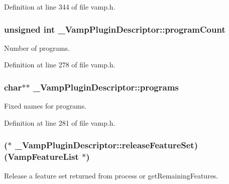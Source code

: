 Definition at line 344 of file vamp.\+h.

\subsubsection[{\texorpdfstring{program\+Count}{programCount}}]{\setlength{\rightskip}{0pt plus 5cm}unsigned {\bf int} \+\_\+\+Vamp\+Plugin\+Descriptor\+::program\+Count}\hypertarget{struct___vamp_plugin_descriptor_a1962666aa173e7a9a2c30dc82e4b2e00}{}\label{struct___vamp_plugin_descriptor_a1962666aa173e7a9a2c30dc82e4b2e00}
Number of programs. 

Definition at line 278 of file vamp.\+h.

\subsubsection[{\texorpdfstring{programs}{programs}}]{ char$\ast$$\ast$ \+\_\+\+Vamp\+Plugin\+Descriptor\+::programs}\hypertarget{struct___vamp_plugin_descriptor_ad488470c582d8472d86455889d71c5ec}{}\label{struct___vamp_plugin_descriptor_ad488470c582d8472d86455889d71c5ec}
Fixed names for programs. 

Definition at line 281 of file vamp.\+h.

\subsubsection[{\texorpdfstring{release\+Feature\+Set}{releaseFeatureSet}}]{($\ast$ \+\_\+\+Vamp\+Plugin\+Descriptor\+::release\+Feature\+Set) ({\bf Vamp\+Feature\+List} $\ast$)}\hypertarget{struct___vamp_plugin_descriptor_ab4ed73ea986582ab1b7e6c44149a982a}{}\label{struct___vamp_plugin_descriptor_ab4ed73ea986582ab1b7e6c44149a982a}
Release a feature set returned from process or get\+Remaining\+Features. 

